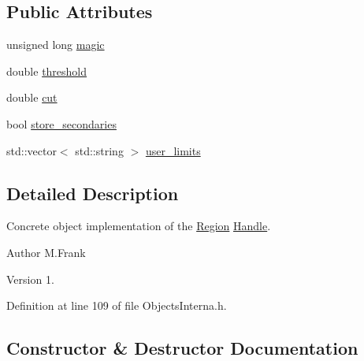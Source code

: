 \subsection*{Public Attributes}
\begin{DoxyCompactItemize}
\item 
unsigned long \hyperlink{class_d_d4hep_1_1_geometry_1_1_region_object_aff7bdedd83403e65c3b749c759e30316}{magic}
\item 
double \hyperlink{class_d_d4hep_1_1_geometry_1_1_region_object_a62b96102392556bd53f18a440dff1483}{threshold}
\item 
double \hyperlink{class_d_d4hep_1_1_geometry_1_1_region_object_a6f1d69c54ce278aea8af3fbad679b0d3}{cut}
\item 
bool \hyperlink{class_d_d4hep_1_1_geometry_1_1_region_object_a531d5176989429dfcb6c6cce094ee209}{store\+\_\+secondaries}
\item 
std\+::vector$<$ std\+::string $>$ \hyperlink{class_d_d4hep_1_1_geometry_1_1_region_object_a6d6a6cffbfc5b1937b3b1c46e2580430}{user\+\_\+limits}
\end{DoxyCompactItemize}


\subsection{Detailed Description}
Concrete object implementation of the \hyperlink{class_d_d4hep_1_1_geometry_1_1_region}{Region} \hyperlink{class_d_d4hep_1_1_handle}{Handle}. 

\begin{DoxyAuthor}{Author}
M.\+Frank 
\end{DoxyAuthor}
\begin{DoxyVersion}{Version}
1. 
\end{DoxyVersion}


Definition at line 109 of file Objects\+Interna.\+h.



\subsection{Constructor \& Destructor Documentation}
\hypertarget{class_d_d4hep_1_1_geometry_1_1_region_object_a2ef1c820eaadf3add13852335e791a62}{}\label{class_d_d4hep_1_1_geometry_1_1_region_object_a2ef1c820eaadf3add13852335e791a62} 
